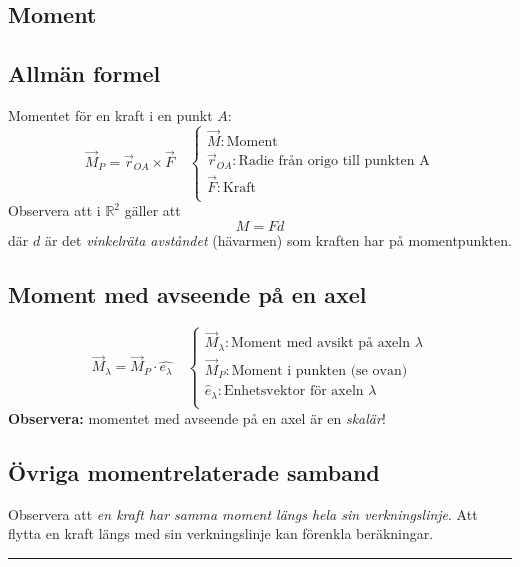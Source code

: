 \documentclass{article}
\newenvironment{ankiflashcard}[1]{}{}
\newcommand{\ruler}{
\rule{0.5\textwidth}{0.5pt}
}
\begin{document}
\begin{paracol}{2}
\begin{ankiflashcard}{Hur definieras moment? (generella definitionen)}
\section{Moment}
\subsection{Allmän formel}
Momentet för en kraft i en punkt $A$:
$$
\vec M_P = \vec r_{OA} \times \vec F\quad\left\{\begin{array}{l}\vec M: \text{Moment} \\\vec r_{OA}: \text{Radie från origo till punkten A} \\\vec F: \text{Kraft} \\\end{array}\right.$$
Observera att i $\mathbb R^2$ gäller att
$$
M = Fd
$$
där $d$ är det \textit{vinkelräta avståndet} (hävarmen) som kraften har på momentpunkten.

    
\end{ankiflashcard}

\begin{ankiflashcard}{Hur definieras momentet med avseende på en axel?}
    
\subsection{Moment med avseende på en axel}
$$
\vec M_{\lambda} = \vec M_P \cdot \hat {e_{\lambda}}\quad\left\{\begin{array}{l}\vec M_{\lambda}: \text{Moment med avsikt på axeln }\lambda \\\vec M_P: \text{Moment i punkten (se ovan)} \\\hat e_\lambda: \text{Enhetsvektor för axeln } \lambda \\\end{array}\right.$$
\textbf{Observera: } momentet med avseende på en axel är en \textit{skalär}!
\end{ankiflashcard}

\begin{ankiflashcard}{Vad finns för generella regler kring moment?}
\subsection{Övriga momentrelaterade samband}
Observera att \textit{en kraft har samma moment längs hela sin verkningslinje}. Att flytta en kraft längs med sin verkningslinje kan förenkla beräkningar.
\end{ankiflashcard}
\ruler

\end{paracol}
\end{document}
